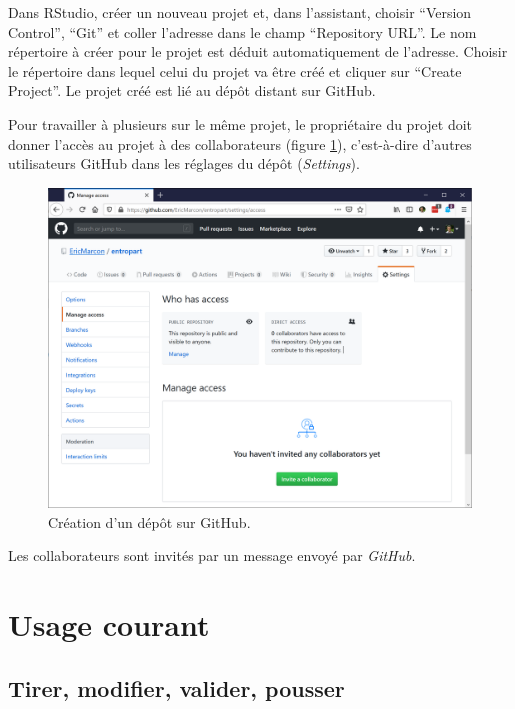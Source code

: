 \documentclass[
  11pt,
  french,
  a4paper,
  extrafontsizes,onecolumn,openright
  ]{memoir}
\begin{document}
Dans RStudio, créer un nouveau projet et, dans l'assistant, choisir ``Version Control'', ``Git'' et coller l'adresse dans le champ ``Repository URL''.
Le nom répertoire à créer pour le projet est déduit automatiquement de l'adresse.
Choisir le répertoire dans lequel celui du projet va être créé et cliquer sur ``Create Project''.
Le projet créé est lié au dépôt distant sur GitHub.

Pour travailler à plusieurs sur le même projet, le propriétaire du projet doit donner l'accès au projet à des collaborateurs (figure \ref{fig:git-Access}), c'est-à-dire d'autres utilisateurs GitHub dans les réglages du dépôt (\emph{Settings}).



\scriptsize

\begin{figure}

{\centering \includegraphics[width=0.8\linewidth]{images/git-Access} 

}

\caption{Création d'un dépôt sur GitHub.}\label{fig:git-Access}
\end{figure}

\normalsize

Les collaborateurs sont invités par un message envoyé par \emph{GitHub}.

\hypertarget{usage-courant}{%
\section{Usage courant}\label{usage-courant}}

\hypertarget{tirer-modifier-valider-pousser}{%
\subsection{Tirer, modifier, valider, pousser}\label{tirer-modifier-valider-pousser}}
\end{document}
